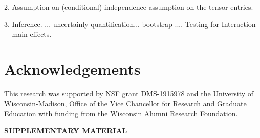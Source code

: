 \documentclass[12pt]{article}
\theoremstyle{plain}
\theoremstyle{definition}
\begin{document}
2. Assumption on (conditional) independence assumption on the tensor entries. 

3. Inference. ... uncertainly quantification... bootstrap ....  Testing for Interaction + main effects. 


\section*{Acknowledgements}
This research was supported by NSF grant DMS-1915978 and the University of Wisconsin-Madison, Office of the Vice Chancellor for Research and Graduate Education with funding from the Wisconsin Alumni Research Foundation. 





\newpage
\begin{center}
{\large\bf SUPPLEMENTARY MATERIAL}
\end{center}

\appendix
\end{document}
